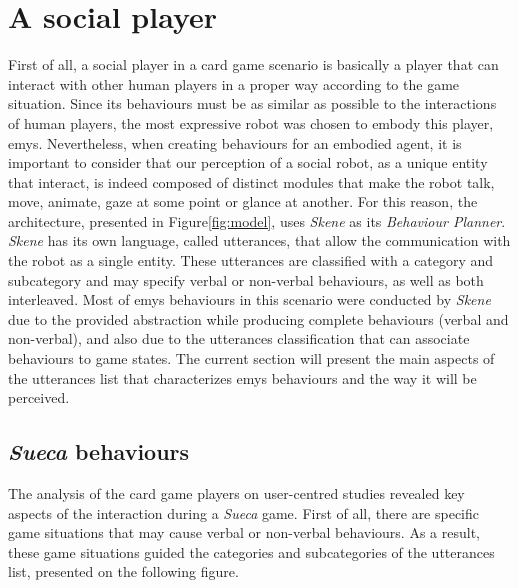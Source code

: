 \section{A social player}
\label{sec:social_player}

First of all, a social player in a card game scenario is basically a player that can interact with other human players in a proper way according to the game situation.
Since its behaviours must be as similar as possible to the interactions of human players, the most expressive robot was chosen to embody this player, \ac{emys}.
Nevertheless, when creating behaviours for an embodied agent, it is important to consider that our perception of a social robot, as a unique entity that interact, is indeed composed of distinct modules that make the robot talk, move, animate, gaze at some point or glance at another.
For this reason, the architecture, presented in Figure\ref{fig:model}, uses \emph{Skene} as its \emph{Behaviour Planner}.
\emph{Skene} has its own language, called utterances, that allow the communication with the robot as a single entity.
These utterances are classified with a category and subcategory and may specify verbal or non-verbal behaviours, as well as both interleaved.
Most of \ac{emys} behaviours in this scenario were conducted by \emph{Skene} due to the provided abstraction while producing complete behaviours (verbal and non-verbal), and also due to the utterances classification that can associate behaviours to game states.
The current section will present the main aspects of the utterances list that characterizes \ac{emys} behaviours and the way it will be perceived.



\subsection{\emph{Sueca} behaviours}
The analysis of the card game players on user-centred studies revealed key aspects of the interaction during a \emph{Sueca} game.
First of all, there are specific game situations that may cause verbal or non-verbal behaviours.
As a result, these game situations guided the categories and subcategories of the utterances list, presented on the following figure.

